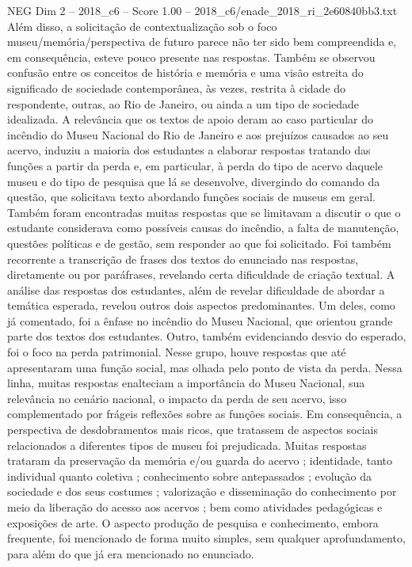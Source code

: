 \begin{textsample}{NEG Dim 2 – 2018\_c6 – Score 1.00 – 2018\_c6/enade\_2018\_ri\_2e60840bb3.txt}
Além disso, a solicitação de contextualização sob o foco museu/memória/perspectiva de futuro parece não ter sido bem compreendida e, em consequência, esteve pouco presente nas respostas.
Também se observou confusão entre os conceitos de história e memória e uma visão estreita do significado de sociedade contemporânea, às vezes, restrita à cidade do respondente, outras, ao Rio de Janeiro, ou ainda a um tipo de sociedade idealizada.
A relevância que os textos de apoio deram ao caso particular do incêndio do Museu Nacional do Rio de Janeiro e aos prejuízos causados ao seu acervo, induziu a maioria dos estudantes a elaborar respostas tratando das funções a partir da perda e, em particular, à perda do tipo de acervo daquele museu e do tipo de pesquisa que lá se desenvolve, divergindo do comando da questão, que solicitava texto abordando funções sociais de museus em geral.
Também foram encontradas muitas respostas que se limitavam a discutir o que o estudante considerava como possíveis causas do incêndio, a falta de manutenção, questões políticas e de gestão, sem responder ao que foi solicitado.
Foi também recorrente a transcrição de frases dos textos do enunciado nas respostas, diretamente ou por paráfrases, revelando certa dificuldade de criação textual.
A análise das respostas dos estudantes, além de revelar dificuldade de abordar a temática esperada, revelou outros dois aspectos predominantes.
Um deles, como já comentado, foi a ênfase no incêndio do Museu Nacional, que orientou grande parte dos textos dos estudantes.
Outro, também evidenciando desvio do esperado, foi o foco na perda patrimonial.
Nesse grupo, houve respostas que até apresentaram uma função social, mas olhada pelo ponto de vista da perda.
Nessa linha, muitas respostas enalteciam a importância do Museu Nacional, sua relevância no cenário nacional, o impacto da perda de seu acervo, isso complementado por frágeis reflexões sobre as funções sociais.
Em consequência, a perspectiva de desdobramentos mais ricos, que tratassem de aspectos sociais relacionados a diferentes tipos de museu foi prejudicada.
Muitas respostas trataram da preservação da memória e/ou guarda do acervo ; identidade, tanto individual quanto coletiva ; conhecimento sobre antepassados ; evolução da sociedade e dos seus costumes ; valorização e disseminação do conhecimento por meio da liberação do acesso aos acervos ; bem como atividades pedagógicas e exposições de arte.
O aspecto produção de pesquisa e conhecimento, embora frequente, foi mencionado de forma muito simples, sem qualquer aprofundamento, para além do que já era mencionado no enunciado.

\end{textsample}
